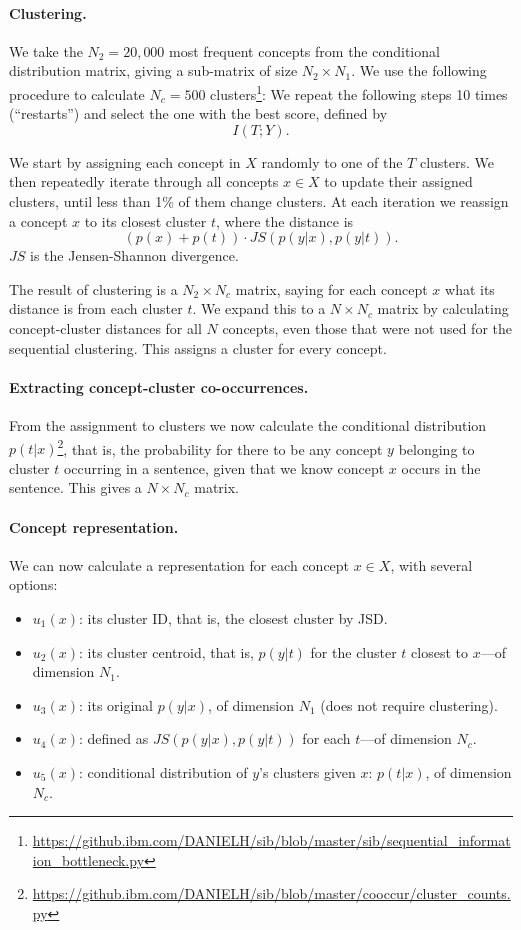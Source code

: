 \documentclass{article}
\begin{document}
\paragraph{Clustering.}

We take the $N_2=20,000$ most frequent concepts from the
conditional distribution matrix, giving a sub-matrix of size $N_2\times N_1$.
We use the following procedure to calculate $N_c=500$
clusters\footnote{\url{https://github.ibm.com/DANIELH/sib/blob/master/sib/sequential_information_bottleneck.py}}:
We repeat the following steps 10 times (``restarts'') and select the one
with the best score, defined by
\[
I(T;Y).
\]

We start by assigning each concept in $X$ randomly to one of the $T$ clusters.
We then repeatedly iterate through all concepts $x\in X$ to update their assigned
clusters, until less than 1\% of them change clusters.
At each iteration we reassign a concept $x$ to its closest cluster $t$,
where the distance is
\[
(p(x)+p(t))\cdot JS(p(y|x),p(y|t)).
\]
$JS$ is the Jensen-Shannon divergence.

The result of clustering is a $N_2 \times N_c$ matrix,
saying for each concept $x$ what its distance is from each cluster $t$.
We expand this to a $N\times N_c$ matrix by calculating concept-cluster
distances for all $N$ concepts, even those that were not used for the
sequential clustering.
This assigns a cluster for every concept.

\paragraph{Extracting concept-cluster co-occurrences.}

From the assignment to clusters we now calculate the conditional distribution
$p(t|x)$\footnote{\url{https://github.ibm.com/DANIELH/sib/blob/master/cooccur/cluster_counts.py}},
that is, the probability for there to be any concept $y$ belonging to cluster $t$
occurring in a sentence, given that we know concept $x$ occurs in the sentence.
This gives a $N\times N_c$ matrix.

\paragraph{Concept representation.}

We can now calculate a representation for each concept $x\in X$,
with several options:
\begin{itemize}
\item $u_1(x)$: its cluster ID, that is, the closest cluster by JSD.
\item $u_2(x)$: its cluster centroid, that is, $p(y|t)$ for the cluster
  $t$ closest to $x$---of dimension $N_1$.
\item $u_3(x)$: its original $p(y|x)$, of dimension $N_1$ (does not require clustering).
\item $u_4(x)$: defined as $JS(p(y|x),p(y|t))$ for each $t$---of dimension $N_c$.
\item $u_5(x)$: conditional distribution of $y$'s clusters given $x$: $p(t|x)$,
  of dimension $N_c$.
\end{itemize}
\end{document}
